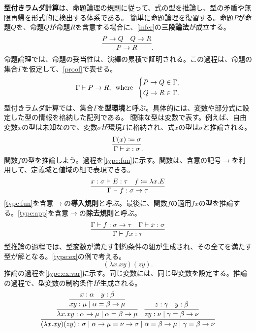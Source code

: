 \documentclass[10pt,a4paper]{book}
\begin{document}
\textbf{型付きラムダ計算}は、命題論理の規則に従って、式の型を推論し、型の矛盾や無限再帰を形式的に検出する体系である。
簡単に命題論理を復習する。命題$P$が命題$Q$を、命題$Q$が命題$R$を含意する場合に、\eqref{infer}の\textbf{三段論法}が成立する。
%
\begin{equation}
\label{eq:infer}
\infer{P \to R}{P \to Q & Q \to R}.
\end{equation}
%
命題論理では、命題の妥当性は、演繹の累積で証明される。この過程は、命題の集合$\Gamma$を仮定して、\eqref{proof}で表せる。
%
\begin{equation}
\label{eq:proof}
\Gamma \vdash P \to R,
\enspace\mathrm{where}\enspace
\left\{
\begin{aligned}
P \to Q \in \Gamma, \\
Q \to R \in \Gamma.
\end{aligned}
\right.
\end{equation}
%
型付きラムダ計算では、集合$\Gamma$を\textbf{型環境}と呼ぶ。具体的には、変数や部分式に設定した型の情報を格納した配列である。
曖昧な型は変数で表す。例えば、自由変数$x$の型は未知なので、変数$\sigma$が環境$\Gamma$に格納され、式$x$の型は$\sigma$と推論される。
%
\begin{equation}
\infer{\Env{x: \sigma}}{\Gamma(x) \coloneqq \sigma}.
\end{equation}
%
関数$f$の型を推論しよう。過程を\eqref{type:fun}に示す。関数は、含意の記号$\to$を利用して、定義域と値域の組で表現できる。
%
\begin{equation}
\label{eq:type:fun}
\infer{\Env{f: \sigma \to \tau}}{x: \sigma \vdash E: \tau & f \coloneqq \lambda x. E}
\end{equation}
%
\eqref{type:fun}を含意$\to$の\textbf{導入規則}と呼ぶ。最後に、関数$f$の適用$fx$の型を推論する。\eqref{type:app}を含意$\to$の\textbf{除去規則}と呼ぶ。
%
\begin{equation}
\label{eq:type:app}
\infer{\Env{f x: \tau}}{\Env{f: \sigma \to \tau} & \Env{x: \sigma}}
\end{equation}
%
型推論の過程では、型変数が満たす制約条件の組が生成され、その全てを満たす型が解となる。\eqref{type:ex}の例で考える。
%
\begin{equation}
\label{eq:type:ex}
(\lambda x.xy)(zy).
\end{equation}
%
推論の過程を\eqref{type:ex:var}に示す。同じ変数には、同じ型変数を設定する。推論の過程で、型変数の制約条件が生成される。
%
\begin{equation}
\label{eq:type:ex:var}
\infer{
(\lambda x.xy)(zy): \sigma
\mid \alpha \to \mu = \nu \to \sigma
\mid \alpha = \beta \to \mu
\mid \gamma = \beta \to \nu
}{
\infer{
\lambda x.xy: \alpha \to \mu \mid \alpha = \beta \to \mu
}{
\infer{xy: \mu \mid \alpha = \beta \to \mu}{x: \alpha & y: \beta}
}
&
\infer{zy: \nu \mid \gamma = \beta \to \nu}{z: \gamma & y: \beta}
}
\end{equation}
\end{document}
